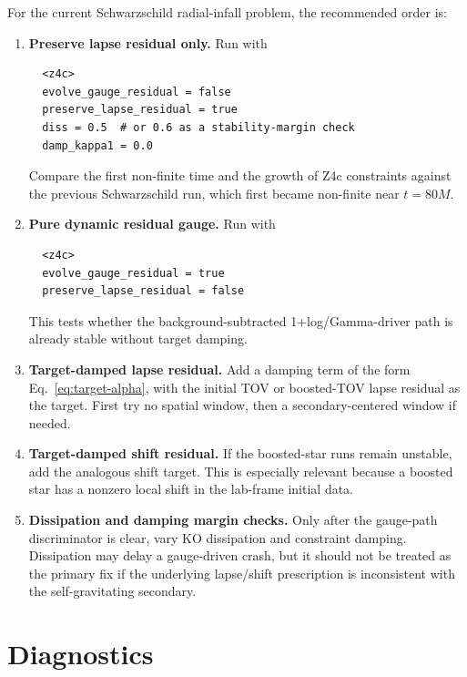 \documentclass[11pt]{article}
\begin{document}
For the current Schwarzschild radial-infall problem, the recommended order is:
\begin{enumerate}[label=\arabic*.]
  \item \textbf{Preserve lapse residual only.}
  Run with
  \begin{verbatim}
  <z4c>
  evolve_gauge_residual = false
  preserve_lapse_residual = true
  diss = 0.5  # or 0.6 as a stability-margin check
  damp_kappa1 = 0.0
  \end{verbatim}
  Compare the first non-finite time and the growth of Z4c constraints against
  the previous Schwarzschild run, which first became non-finite near \(t=80M\).

  \item \textbf{Pure dynamic residual gauge.}
  Run with
  \begin{verbatim}
  <z4c>
  evolve_gauge_residual = true
  preserve_lapse_residual = false
  \end{verbatim}
  This tests whether the background-subtracted 1+log/Gamma-driver path is
  already stable without target damping.

  \item \textbf{Target-damped lapse residual.}
  Add a damping term of the form Eq.~\eqref{eq:target-alpha}, with the initial
  TOV or boosted-TOV lapse residual as the target.  First try no spatial
  window, then a secondary-centered window if needed.

  \item \textbf{Target-damped shift residual.}
  If the boosted-star runs remain unstable, add the analogous shift target.
  This is especially relevant because a boosted star has a nonzero local
  shift in the lab-frame initial data.

  \item \textbf{Dissipation and damping margin checks.}
  Only after the gauge-path discriminator is clear, vary KO dissipation and
  constraint damping.  Dissipation may delay a gauge-driven crash, but it
  should not be treated as the primary fix if the underlying lapse/shift
  prescription is inconsistent with the self-gravitating secondary.
\end{enumerate}

\section{Diagnostics}
\end{document}
